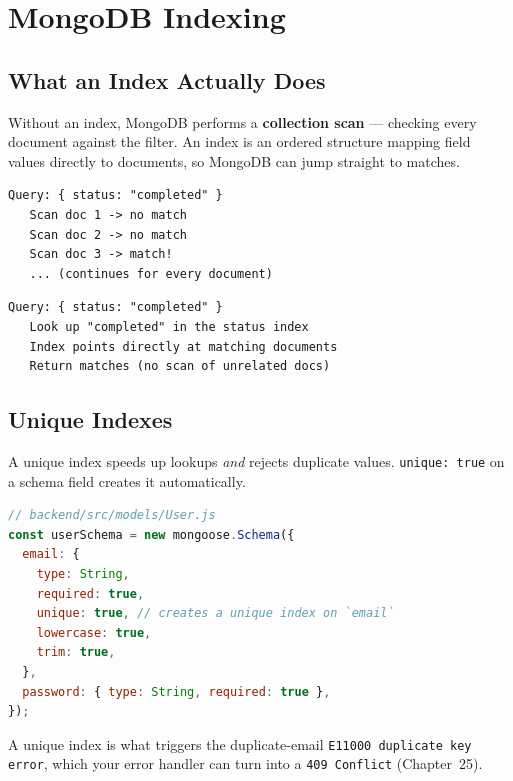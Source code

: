 \chapter{MongoDB Indexing}

\section{What an Index Actually Does}

Without an index, MongoDB performs a \textbf{collection scan} --- checking
every document against the filter. An index is an ordered structure mapping
field values directly to documents, so MongoDB can jump straight to matches.

\begin{diagrambox}
\begin{verbatim}
Query: { status: "completed" }
   Scan doc 1 -> no match
   Scan doc 2 -> no match
   Scan doc 3 -> match!
   ... (continues for every document)
\end{verbatim}
\end{diagrambox}

\begin{diagrambox}
\begin{verbatim}
Query: { status: "completed" }
   Look up "completed" in the status index
   Index points directly at matching documents
   Return matches (no scan of unrelated docs)
\end{verbatim}
\end{diagrambox}

\section{Unique Indexes}

A unique index speeds up lookups \emph{and} rejects duplicate values.
\texttt{unique: true} on a schema field creates it automatically.

\begin{lstlisting}[language=JavaScript]
// backend/src/models/User.js
const userSchema = new mongoose.Schema({
  email: {
    type: String,
    required: true,
    unique: true, // creates a unique index on `email`
    lowercase: true,
    trim: true,
  },
  password: { type: String, required: true },
});
\end{lstlisting}

\begin{notebox}[NOTE]
A unique index is what triggers the duplicate-email
\texttt{E11000 duplicate key error}, which your error handler can turn into
a \texttt{409 Conflict} (Chapter~25).
\end{notebox}

